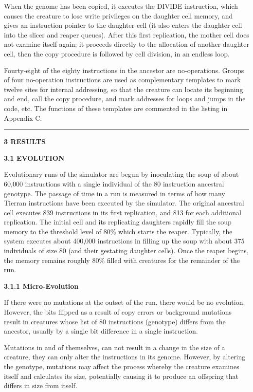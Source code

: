 When the genome has been copied, it executes the DIVIDE instruction, which
causes the creature to lose write privileges on the daughter cell memory,
and gives an instruction pointer to the daughter cell (it also enters the
daughter cell into the slicer and reaper queues).  After this first
replication, the mother cell does not examine itself again; it proceeds
directly to the allocation of another daughter cell, then the copy procedure
is followed by cell division, in an endless loop.

Fourty-eight of the eighty instructions in the ancestor are no-operations.
Groups of four no-operation instructions are used as complementary templates
to mark twelve sites for internal addressing, so that the creature can locate
its beginning and end, call the copy procedure, and mark addresses for loops
and jumps in the code, etc.  The functions of these templates are commented
in the listing in Appendix C.

\pagebreak

\LP
\rule[6pt]{6.5in}{1pt}

\large \bf 3 RESULTS\rm \normalsize

\bf 3.1 EVOLUTION\rm
\eLP

Evolutionary runs of the simulator are begun by inoculating the soup of about
60,000 instructions with a single individual of the 80 instruction ancestral
genotype.  The passage of time in a run is measured in terms of how many
Tierran instructions have been executed by the simulator.  The original
ancestral cell executes 839 instructions in its first replication, and 813 for
each additional replication.  The initial cell and its replicating daughters
rapidly fill the soup memory to the threshold level of 80\% which starts the
reaper.  Typically, the system executes about 400,000 instructions in filling
up the soup with about 375 individuals of size 80 (and their gestating
daughter cells).  Once the reaper begins, the memory remains roughly 80\%
filled with creatures for the remainder of the run.

\LP
\bf 3.1.1 Micro-Evolution\rm
\eLP

If there were no mutations at the outset of the run, there would be no
evolution.  However, the bits flipped as a result of copy errors or background
mutations result in creatures whose list of 80 instructions (genotype) differs
from the ancestor, usually by a single bit difference in a single instruction.

Mutations in and of themselves, can not result in a change in the size of
a creature, they can only alter the instructions in its genome.  However,
by altering the genotype, mutations may affect the process whereby the
creature examines itself and calculates its size, potentially causing it
to produce an offspring that differs in size from itself.

